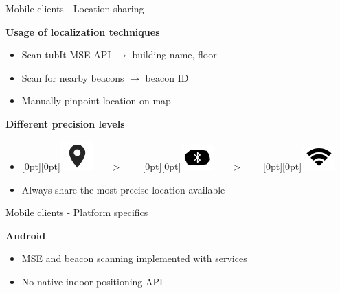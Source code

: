 \documentclass[11pt]{beamer}
\begin{document}
\begin{frame}{Mobile clients - Location sharing}

  \textbf{Usage of localization techniques}\\[1em]
  \begin{itemize}
    \item Scan tubIt MSE API $\rightarrow$ building name, floor
    \item Scan for nearby beacons $\rightarrow$  beacon ID
    \item Manually pinpoint location on map
  \end{itemize}
  \bigskip
  \pause
  \textbf{Different precision levels}\\[1em]
  \begin{itemize}
    \item \raisebox{-8pt}[0pt][0pt]{\includegraphics[width=0.1\textwidth]{location-symbol}}~~~~>~~~~%
          \raisebox{-8pt}[0pt][0pt]{\includegraphics[width=0.1\textwidth]{beacon-symbol}}~~~~>~~~~%
          \raisebox{-8pt}[0pt][0pt]{\includegraphics[width=0.1\textwidth]{wifi-symbol}}
    \item Always share the most precise location available
  \end{itemize}

\end{frame}


\begin{frame}{Mobile clients - Platform specifics}

  \textbf{Android}

  \begin{itemize}

    \item MSE and beacon scanning implemented with services
    \item No native indoor positioning API

  \end{itemize}

\end{frame}
\end{document}
